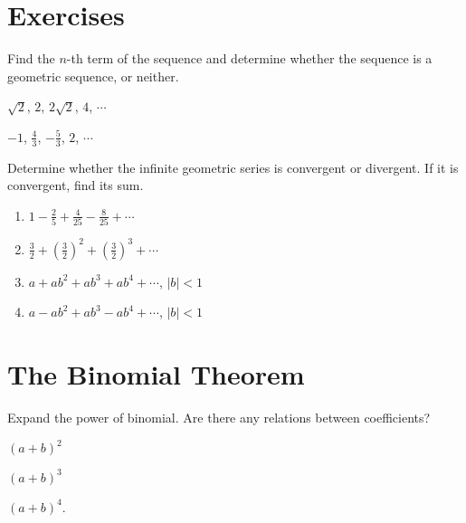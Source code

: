 % 
\newpage

\section*{Exercises}

\begin{exercise}
Find the $n$-th term of the sequence and determine whether the sequence is a geometric sequence, or neither.\\ 
\begin{enumerate*}
    \item $\sqrt{2}$, $2$, $2\sqrt{2}$, $4$, $\cdots$
    \item $-1$, $\frac{4}{3}$, $-\frac{5}{3}$, $2$, $\cdots$\hfill\null
\end{enumerate*}
\end{exercise}
  
\begin{exercise}
  Determine whether the infinite geometric series is convergent or divergent. If it is convergent, find its sum.\\
    \begin{enumerate}
        \item $1-\frac25+\frac{4}{25}-\frac{8}{25}+\cdots$
        \item $\frac{3}{2}+\left(\frac{3}{2}\right)^2+\left(\frac{3}{2}\right)^3+\cdots$
        \item $a+ab^2+ab^3+ab^4+\cdots$, $|b|<1$
        \item $a-ab^2+ab^3-ab^4+\cdots$, $|b|<1$
    \end{enumerate}
\end{exercise}

\newpage

\section{The Binomial Theorem}

\begin{example}
    Expand the power of binomial. Are there any relations between coefficients?\\
\begin{enumerate*}
    \item $(a+b)^2$
    \item $(a+b)^3$
    \item $(a+b)^4$.
\end{enumerate*}
\end{example}


